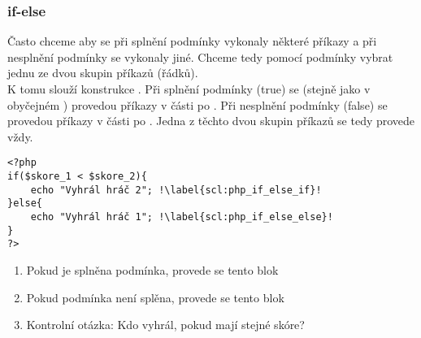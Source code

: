 \subsubsection{if-else}
Často chceme aby se při splnění podmínky vykonaly některé příkazy a při nesplnění podmínky se vykonaly jiné. Chceme tedy pomocí podmínky vybrat jednu ze dvou skupin příkazů (řádků).\\
K tomu slouží konstrukce . Při splnění podmínky (true) se (stejně jako v obyčejném ) provedou příkazy v části po . Při nesplnění podmínky (false) se provedou příkazy v části po . Jedna z těchto dvou skupin příkazů se tedy provede vždy.\\
\begin{minipage}[t]{.45\textwidth}
\begin{code}
\begin{verbatim}
<?php
if($skore_1 < $skore_2){
	echo "Vyhrál hráč 2"; !\label{scl:php_if_else_if}!
}else{
	echo "Vyhrál hráč 1"; !\label{scl:php_if_else_else}!
}
?>
\end{verbatim}

\label{code:php_if_else}
\end{code}
\end{minipage}
\begin{minipage}[t]{.45\textwidth}
\begin{enumerate}
\item[ř. \ref{scl:php_if_else_if}:] Pokud je splněna podmínka, provede se tento blok
\item[ř. \ref{scl:php_if_else_else}:] Pokud podmínka není splěna, provede se tento blok
\item[] Kontrolní otázka: Kdo vyhrál, pokud mají stejné skóre?
\end{enumerate}
\end{minipage}\\

